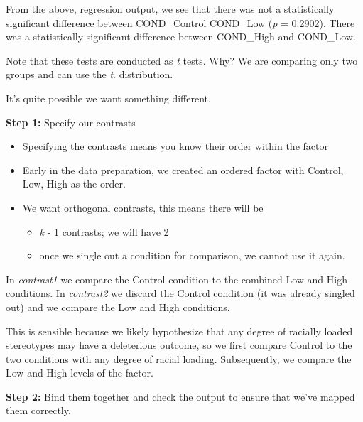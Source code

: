 \documentclass[
  english,
]{book}
\newenvironment{Shaded}{\begin{snugshade}}{\end{snugshade}}
\newcommand{\CommentTok}[1]{\textcolor[rgb]{0.56,0.35,0.01}{\textit{#1}}}
\newcommand{\DecValTok}[1]{\textcolor[rgb]{0.00,0.00,0.81}{#1}}
\newcommand{\KeywordTok}[1]{\textcolor[rgb]{0.13,0.29,0.53}{\textbf{#1}}}
\newcommand{\NormalTok}[1]{#1}
\newcommand{\OperatorTok}[1]{\textcolor[rgb]{0.81,0.36,0.00}{\textbf{#1}}}
\newcommand{\StringTok}[1]{\textcolor[rgb]{0.31,0.60,0.02}{#1}}
\providecommand{\tightlist}{%
  \setlength{\itemsep}{0pt}\setlength{\parskip}{0pt}}
\begin{document}
From the above, regression output, we see that there was not a statistically significant difference between COND\_Control COND\_Low (\emph{p} = 0.2902). There was a statistically significant difference between COND\_High and COND\_Low.

Note that these tests are conducted as \emph{t} tests. Why? We are comparing only two groups and can use the \emph{t}. distribution.

It's quite possible we want something different.

\textbf{Step 1: } Specify our contrasts

\begin{itemize}
\tightlist
\item
  Specifying the contrasts means you know their order within the factor
\item
  Early in the data preparation, we created an ordered factor with Control, Low, High as the order.
\item
  We want orthogonal contrasts, this means there will be

  \begin{itemize}
  \tightlist
  \item
    \emph{k} - 1 contrasts; we will have 2
  \item
    once we single out a condition for comparison, we cannot use it again.
  \end{itemize}
\end{itemize}

In \emph{contrast1} we compare the Control condition to the combined Low and High conditions.
In \emph{contrast2} we discard the Control condition (it was already singled out) and we compare the Low and High conditions.

This is sensible because we likely hypothesize that any degree of racially loaded stereotypes may have a deleterious outcome, so we first compare Control to the two conditions with any degree of racial loading. Subsequently, we compare the Low and High levels of the factor.

\textbf{Step 2:} Bind them together and check the output to ensure that we've mapped them correctly.

\begin{Shaded}
\end{Shaded}
\end{document}
